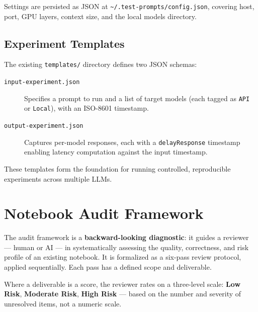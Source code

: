 \documentclass[11pt, a4paper]{article}
\begin{document}
Settings are persisted as JSON at \texttt{\textasciitilde/.test-prompts/config.json},
covering host, port, GPU layers, context size, and the local models directory.

\subsection{Experiment Templates}

The existing \texttt{templates/} directory defines two JSON schemas:

\begin{description}
  \item[\texttt{input-experiment.json}] Specifies a prompt to run and a list of
        target models (each tagged as \texttt{API} or \texttt{Local}), with an
        ISO-8601 timestamp.

  \item[\texttt{output-experiment.json}] Captures per-model responses, each
        with a \texttt{delayResponse} timestamp enabling latency computation
        against the input timestamp.
\end{description}

These templates form the foundation for running controlled, reproducible
experiments across multiple LLMs.

\section{Notebook Audit Framework}

The audit framework is a \textbf{backward-looking diagnostic}: it guides a
reviewer — human or AI — in systematically assessing the quality, correctness,
and risk profile of an existing notebook. It is formalized as a six-pass review
protocol, applied sequentially. Each pass has a defined scope and deliverable.

Where a deliverable is a score, the reviewer rates on a three-level scale:
\textbf{Low Risk}, \textbf{Moderate Risk}, \textbf{High Risk} — based on the
number and severity of unresolved items, not a numeric scale.
\end{document}
